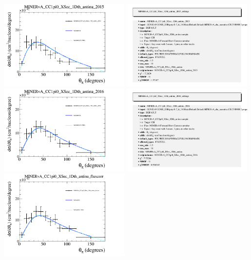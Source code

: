 \documentclass{article}
\begin{document}
\centering
\includegraphics[width=0.49\textwidth]{figures/nuisance_MINERvA_CC1pi0_XSec_1Dth_antinu_2015_comp.png}
\includegraphics[width=0.49\textwidth]{figures/nuisance_MINERvA_CC1pi0_XSec_1Dth_antinu_2015_info.png}
\centering
\includegraphics[width=0.49\textwidth]{figures/nuisance_MINERvA_CC1pi0_XSec_1Dth_antinu_2016_comp.png}
\includegraphics[width=0.49\textwidth]{figures/nuisance_MINERvA_CC1pi0_XSec_1Dth_antinu_2016_info.png}
\centering
\includegraphics[width=0.49\textwidth]{figures/nuisance_MINERvA_CC1pi0_XSec_1Dth_antinu_fluxcorr_comp.png}
\end{document}
